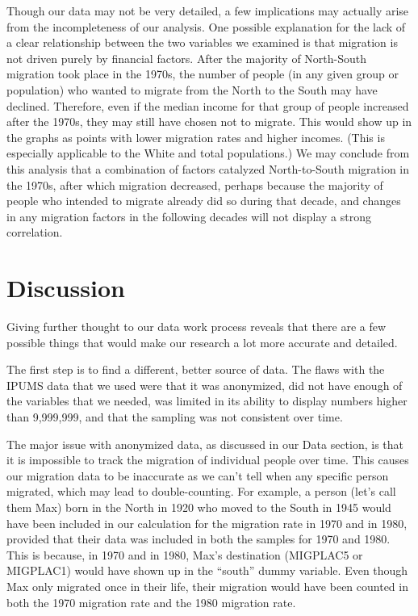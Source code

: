 \documentclass[12pt]{article}
\begin{document}
Though our data may not be very detailed, a few implications may actually arise from the incompleteness of our analysis. One possible explanation for the lack of a clear relationship between the two variables we examined is that migration is not driven purely by financial factors. After the majority of North-South migration took place in the 1970s, the number of people (in any given group or population) who wanted to migrate from the North to the South may have declined. Therefore, even if the median income for that group of people increased after the 1970s, they may still have chosen not to migrate. This would show up in the graphs as points with lower migration rates and higher incomes. (This is especially applicable to the White and total populations.) We may conclude from this analysis that a combination of factors catalyzed North-to-South migration in the 1970s, after which migration decreased, perhaps because the majority of people who intended to migrate already did so during that decade, and changes in any migration factors in the following decades will not display a strong correlation. 

\section{Discussion}
\label{sec:discussion}

Giving further thought to our data work process reveals that there are a few possible things that would make our research a lot more accurate and detailed. 

The first step is to find a different, better source of data. The flaws with the IPUMS data that we used were that it was anonymized, did not have enough of the variables that we needed, was limited in its ability to display numbers higher than 9,999,999, and that the sampling was not consistent over time. 

The major issue with anonymized data, as discussed in our Data section, is that it is impossible to track the migration of individual people over time. This causes our migration data to be inaccurate as we can’t tell when any specific person migrated, which may lead to double-counting. For example, a person (let’s call them Max) born in the North in 1920 who moved to the South in 1945 would have been included in our calculation for the migration rate in 1970 and in 1980, provided that their data was included in both the samples for 1970 and 1980. This is because, in 1970 and in 1980, Max’s destination (MIGPLAC5 or MIGPLAC1) would have shown up in the “south” dummy variable. Even though Max only migrated once in their life, their migration would have been counted in both the 1970 migration rate and the 1980 migration rate. 
\end{document}
